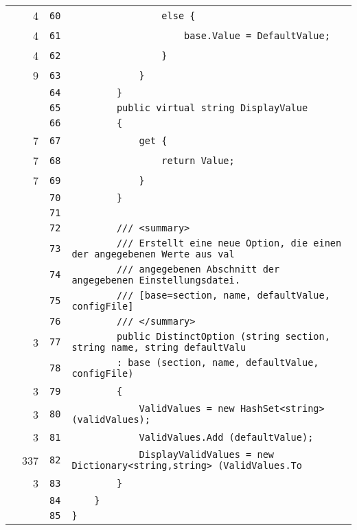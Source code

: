 \documentclass[a4paper,10pt]{article}
\begin{document}
\begin{longtable}[l]{lrrl}
\cellcolor{green} & 4 & \verb~60~ & \verb~                else {~\\
\cellcolor{green} & 4 & \verb~61~ & \verb~                    base.Value = DefaultValue;~\\
\cellcolor{green} & 4 & \verb~62~ & \verb~                }~\\
\cellcolor{green} & 9 & \verb~63~ & \verb~            }~\\
\cellcolor{gray} &  & \verb~64~ & \verb~        }~\\
\cellcolor{gray} &  & \verb~65~ & \verb~        public virtual string DisplayValue~\\
\cellcolor{gray} &  & \verb~66~ & \verb~        {~\\
\cellcolor{green} & 7 & \verb~67~ & \verb~            get {~\\
\cellcolor{green} & 7 & \verb~68~ & \verb~                return Value;~\\
\cellcolor{green} & 7 & \verb~69~ & \verb~            }~\\
\cellcolor{gray} &  & \verb~70~ & \verb~        }~\\
\cellcolor{gray} &  & \verb~71~ & \verb~~\\
\cellcolor{gray} &  & \verb~72~ & \verb~        /// <summary>~\\
\cellcolor{gray} &  & \verb~73~ & \verb~        /// Erstellt eine neue Option, die einen der angegebenen Werte aus val~\\
\cellcolor{gray} &  & \verb~74~ & \verb~        /// angegebenen Abschnitt der angegebenen Einstellungsdatei.~\\
\cellcolor{gray} &  & \verb~75~ & \verb~        /// [base=section, name, defaultValue, configFile]~\\
\cellcolor{gray} &  & \verb~76~ & \verb~        /// </summary>~\\
\cellcolor{green} & 3 & \verb~77~ & \verb~        public DistinctOption (string section, string name, string defaultValu~\\
\cellcolor{gray} &  & \verb~78~ & \verb~        : base (section, name, defaultValue, configFile)~\\
\cellcolor{green} & 3 & \verb~79~ & \verb~        {~\\
\cellcolor{green} & 3 & \verb~80~ & \verb~            ValidValues = new HashSet<string> (validValues);~\\
\cellcolor{green} & 3 & \verb~81~ & \verb~            ValidValues.Add (defaultValue);~\\
\cellcolor{green} & 337 & \verb~82~ & \verb~            DisplayValidValues = new Dictionary<string,string> (ValidValues.To~\\
\cellcolor{green} & 3 & \verb~83~ & \verb~        }~\\
\cellcolor{gray} &  & \verb~84~ & \verb~    }~\\
\cellcolor{gray} &  & \verb~85~ & \verb~}~\\
\end{longtable}
\newpage
\end{document}
